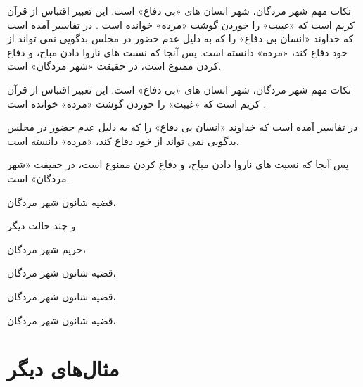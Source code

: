 \documentclass{report}
\begin{document}
\begin{warning}{نکات مهم}
شهر مردگان، شهر انسان های «بی دفاع» است. این تعبیر اقتباس از قرآن کریم است که «غیبت» را خوردن گوشت «مرده» خوانده است . در تفاسیر آمده است که خداوند «انسان بی دفاع» را که به دلیل عدم حضور در مجلس بدگویی نمی تواند از خود دفاع کند، «مرده» دانسته است. پس آنجا که نسبت های ناروا دادن مباح، و دفاع کردن ممنوع است، در حقیقت «شهر مردگان» است.
\end{warning}


\begin{goal}{نکات مهم}
شهر مردگان، شهر انسان های «بی دفاع» است. این تعبیر اقتباس از قرآن کریم است که «غیبت» را خوردن گوشت «مرده» خوانده است . 

در تفاسیر آمده است که خداوند «انسان بی دفاع» را که به دلیل عدم حضور در مجلس بدگویی نمی تواند از خود دفاع کند، «مرده» دانسته است.

  پس آنجا که نسبت های ناروا دادن مباح، و دفاع کردن ممنوع است، در حقیقت «شهر مردگان» است.
\end{goal}

\begin{ntpoint}{قضیه شانون}
شهر مردگان،
\end{ntpoint}
و چند حالت دیگر
\begin{ntdefinition}{حریم}
شهر مردگان،
\end{ntdefinition}

\begin{nttheorem}{قضیه شانون}
شهر مردگان،
\end{nttheorem}

\begin{theorem}{قضیه شانون}
شهر مردگان،
\end{theorem}

\begin{lemma}{قضیه شانون}
شهر مردگان،
\end{lemma}



\chapter{مثال‌های دیگر}
\end{document}
